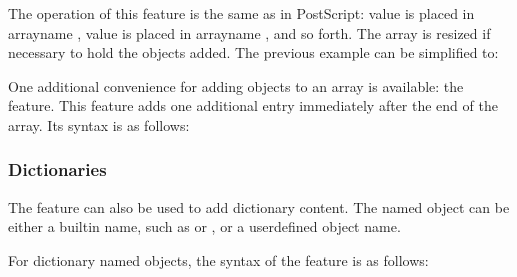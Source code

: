 \documentclass[letterpaper,12pt,english,openany,oneside]{sphinxmanual}
\begin{document}
The operation of this feature is the same as in PostScript: value  is placed in arrayname  , value  is placed in arrayname  , and so forth. The array is resized if necessary to hold the objects added. The previous example can be simplified to:

\begin{sphinxVerbatim}[commandchars=\\\{\}]
\PYG{p}{[}      
\PYG{p}{[}   \PYG{p}{[}    \PYG{p}{]}  
\end{sphinxVerbatim}

One additional convenience for adding objects to an array is available: the  feature. This feature adds one additional entry immediately after the end of the array. Its syntax is as follows:

\begin{sphinxVerbatim}[commandchars=\\\{\}]
\PYG{p}{[} 
 
\end{sphinxVerbatim}


\subsubsection{Dictionaries}
\label{\detokenize{pdfmark_Syntax:dictionaries}}
The  feature can also be used to add dictionary content. The named object can be either a built\sphinxhyphen{}in name, such as  or  , or a user\sphinxhyphen{}defined object name.

For dictionary named objects, the syntax of the  feature is as follows:

\begin{sphinxVerbatim}[commandchars=\\\{\}]
\PYG{p}{[}   
 






   
\end{sphinxVerbatim}
\end{document}

